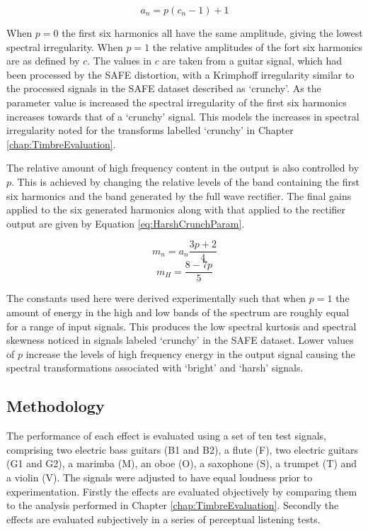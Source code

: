 			\begin{equation}
				a_{n} = p(c_{n} - 1) + 1
				\label{eq:HarshCrunchAmps}
			\end{equation}

			When $p = 0$ the first six harmonics all have the same amplitude, giving the lowest spectral
			irregularity. When $p = 1$ the relative amplitudes of the fort six harmonics are as defined by $c$.
			The values in $c$ are taken from a guitar signal, which had been processed by the SAFE distortion,
			with a Krimphoff irregularity similar to the processed signals in the SAFE dataset described as
			`crunchy'. As the parameter value is increased the spectral irregularity of the first six harmonics
			increases towards that of a `crunchy' signal. This models the increases in spectral irregularity
			noted for the transforms labelled `crunchy' in Chapter \ref{chap:TimbreEvaluation}.
			
			The relative amount of high frequency content in the output is also controlled by $p$. This is
			achieved by changing the relative levels of the band containing the first six harmonics and the band
			generated by the full wave rectifier. The final gains applied to the six generated harmonics along
			with that applied to the rectifier output are given by Equation \ref{eq:HarshCrunchParam}.

			\[ m_{n} = a_{n}\frac{3p + 2}{4} \]
			\begin{equation}
				m_{H} = \frac{8 - 7p}{5}
				\label{eq:HarshCrunchParam}
			\end{equation}

			The constants used here were derived experimentally such that when $p = 1$ the amount of energy in
			the high and low bands of the spectrum are roughly equal for a range of input signals. This produces
			the low spectral kurtosis and spectral skewness noticed in signals labeled `crunchy' in the SAFE
			dataset. Lower values of $p$ increase the levels of high frequency energy in the output signal
			causing the spectral transformations associated with `bright' and `harsh' signals.

	\subsection{Methodology}
	\label{sec:PerceptualExperiments-SemanticControl-Methodology}
		The performance of each effect is evaluated using a set of ten test signals, comprising two electric bass
		guitars (B1 and B2), a flute (F), two electric guitars (G1 and G2), a marimba (M), an oboe (O), a saxophone
		(S), a trumpet (T) and a violin (V). The signals were adjusted to have equal loudness prior to
		experimentation.  Firstly the effects are evaluated objectively by comparing them to the analysis performed
		in Chapter \ref{chap:TimbreEvaluation}. Secondly the effects are evaluated subjectively in a series of
		perceptual listening tests.

